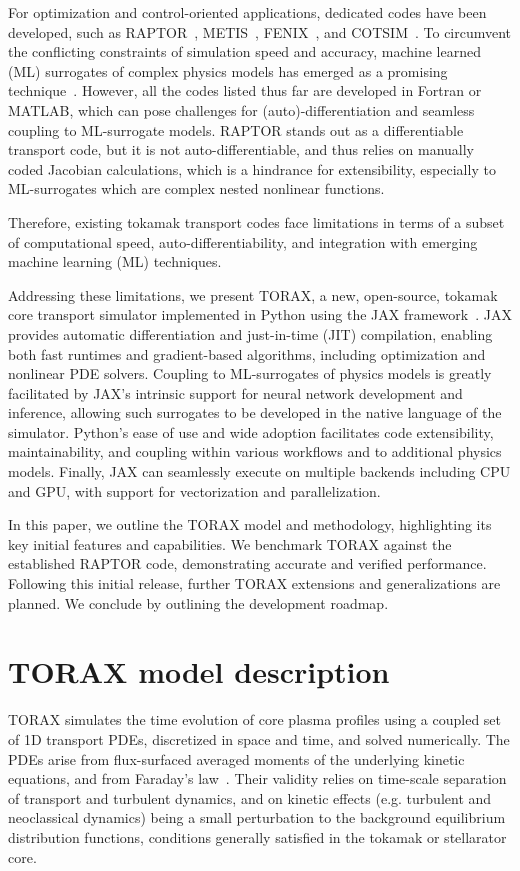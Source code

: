 \documentclass[aps, reprint, nofootinbib]{revtex4-2}
\begin{document}
For optimization and control-oriented applications, dedicated codes have been developed, such as RAPTOR~\cite{felici:2012, felici:2018}, METIS~\cite{artaud:2018}, FENIX~\cite{janky:2021}, and COTSIM~\cite{morosohk:2021}. To circumvent the conflicting constraints of simulation speed and accuracy, machine learned (ML) surrogates of complex physics models has emerged as a promising technique~\cite{meneghini:2017,vandeplassche:2020,ho:2023,boyer:2019,citrin:2023genenn,joung:2023,rodriguez-fernandez:2022c,morosohk:2024}. However, all the codes listed thus far are developed in Fortran or MATLAB, which can pose challenges for (auto)-differentiation and seamless coupling to ML-surrogate models. RAPTOR stands out as a differentiable transport code, but it is not auto-differentiable, and thus relies on manually coded Jacobian calculations, which is a hindrance for extensibility, especially to ML-surrogates which are complex nested nonlinear functions.

Therefore, existing tokamak transport codes face limitations in terms of a subset of computational speed,  auto-differentiability, and integration with emerging machine learning (ML) techniques. 

Addressing these limitations, we present TORAX, a new, open-source, tokamak core transport simulator implemented in Python using the JAX framework~\cite{jax:2018github}. JAX provides automatic differentiation and just-in-time (JIT) compilation, enabling both fast runtimes and gradient-based algorithms, including optimization and nonlinear PDE solvers. Coupling to ML-surrogates of physics models is greatly facilitated by JAX's intrinsic support for neural network development and inference, allowing such surrogates to be developed in the native language of the simulator. Python's ease of use and wide adoption facilitates code extensibility, maintainability, and coupling within various workflows and to additional physics models. Finally, JAX can seamlessly execute on multiple backends including CPU and GPU, with support for vectorization and parallelization.

In this paper, we outline the TORAX model and methodology, highlighting its key initial features and capabilities. We benchmark TORAX against the established RAPTOR code, demonstrating accurate and verified performance. Following this initial release, further TORAX extensions and generalizations are planned. We conclude by outlining the development roadmap.

\section{TORAX model description}
TORAX simulates the time evolution of core plasma profiles using a coupled set of 1D transport PDEs, discretized in space and time, and solved numerically. The PDEs arise from flux-surfaced averaged moments of the underlying kinetic equations, and from Faraday's law~\cite{hinton:1976}. Their validity relies on time-scale separation of transport and turbulent dynamics, and on kinetic effects (e.g. turbulent and neoclassical dynamics) being a small perturbation to the background equilibrium distribution functions, conditions generally satisfied in the tokamak or stellarator core.
\end{document}
